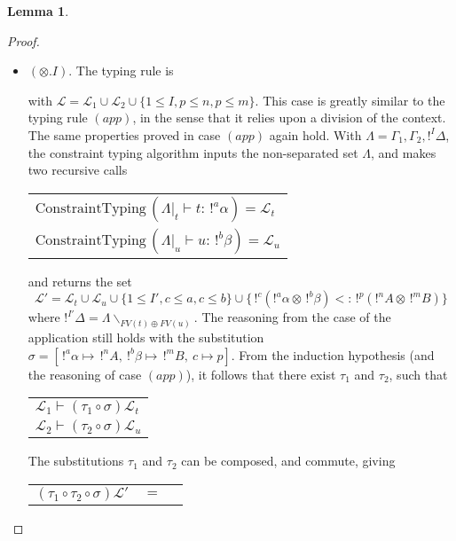 \documentclass[9pt]{article}
\theoremstyle{plain}
\theoremstyle{definition}
\newtheorem{lemma}{Lemma}[section]
\newcommand{\pair}[2]{\langle #1, #2 \rangle}
\begin{document}
\begin{lemma}
\begin{proof}
\begin{itemize}
			\item $(\otimes.I)$. The typing rule is
				\begin{prooftree}
					\BinaryInfC{$\Gamma_1, \Gamma_2, !^I\Delta \vdash_\mathcal{L} \pair{t}{u} : \,!^p(!^nA \otimes \,!^mB)$}
				\end{prooftree}
				with $\mathcal{L} = \mathcal{L}_1 \cup \mathcal{L}_2 \cup \{ 1 \le I, p \le n, p \le m \}$.
				This case is greatly similar to the typing rule $(app)$, in the sense that it relies upon a division of the context.
				The same properties proved in case $(app)$ again hold.
				With $\Lambda = \Gamma_1, \Gamma_2, !^I \Delta$,
				the constraint typing algorithm inputs the non-separated set $\Lambda$, and makes two recursive calls
			 		\begin{center}
			 		\begin{tabular}{l}
			 			$\text{ConstraintTyping} \, (\Lambda |_t \vdash t : \, !^a\alpha) = \mathcal{L}_t$ \\
			 			$\text{ConstraintTyping} \, (\Lambda |_u \vdash u : \, !^b\beta) = \mathcal{L}_u$
			 		\end{tabular}
			 		\end{center}
			 	and returns the set
			 		$$ \mathcal{L'} = \mathcal{L}_t \cup \mathcal{L}_u \cup \{ 1 \le I', c \le a, c \le b \} \cup
			 			\{ \,!^c(!^a\alpha \otimes \,!^b\beta) <: \,!^p(!^nA \otimes \,!^mB) \} $$
			 	where $!^{I'} \Delta = \Lambda \backslash_{FV(t) \oplus FV(u)}$.
			 	The reasoning from the case of the application still holds with the substitution
			 	$\sigma = [\, !^a\alpha \mapsto \,!^nA, ~!^b\beta \mapsto \,!^mB, ~ c \mapsto p ]$.
			 	From the induction hypothesis (and the reasoning of case $(app)$), it follows that there exist $\tau_1$ and $\tau_2$, such that
			 		\begin{center}
			 		\begin{tabular}{l}
			 			$\mathcal{L}_1 \vdash (\tau_1 \circ \sigma) \mathcal{L}_t$ \\
			 			$\mathcal{L}_2 \vdash (\tau_2 \circ \sigma) \mathcal{L}_u$
			 		\end{tabular}
			 		\end{center}
				The substitutions $\tau_1$ and $\tau_2$ can be composed, and commute, giving
			 		\begin{center}
			 		\begin{tabular}{lcl}
			 			$(\tau_1 \circ \tau_2 \circ \sigma) \mathcal{L}'$ & $=$ & 

\end{tabular}
\end{center}
\end{itemize}
\end{proof}
\end{lemma}
\end{document}
